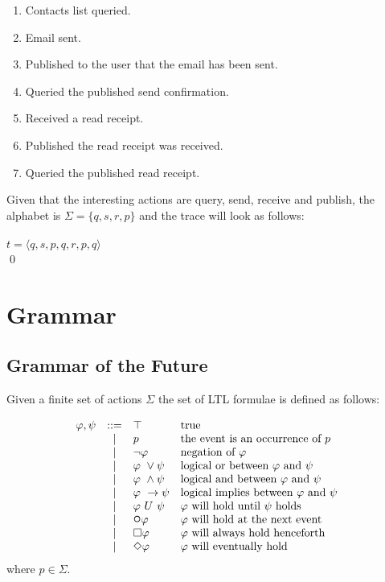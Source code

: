 \begin{definition}
\begin{myEx}
\begin{enumerate}
\item  Contacts list queried.
\item  Email sent.
\item  Published to the user that the email has been sent.
\item  Queried the published send confirmation.
\item  Received a read receipt.
\item  Published the read receipt was received.
\item  Queried the published read receipt.
\end{enumerate}

Given that the interesting actions are query, send, receive and publish, the alphabet is $\Sigma = \{ q, s, r, p \}$ and the trace will look as follows:\\
\\
$ t = \langle q, s, p, q, r, p, q \rangle $\\
\qed
\end{myEx}
\end{definition}

\section{Grammar}

\subsection{Grammar of the Future}
\label{sec:LTLFutureGrammar}

\begin{definition}Given a finite set of actions $ \Sigma $ the set of LTL formulae is defined as follows:

$$ \begin{array}{lcll}
\varphi, \psi & ::= & \top & \mbox{true}\
\\
& | & p & \mbox{the event is an occurrence of}\ p\ 
\\ 
&| & \neg\varphi & \mbox{negation of}\ \varphi\ 
\\
&| & \varphi\ \lor \psi & \mbox{logical or between}\ \varphi\ \mbox{and}\ \psi\
\\
&| & \varphi\ \land \psi & \mbox{logical and between}\ \varphi\ \mbox{and}\ \psi\
\\
& | & \varphi\ \rightarrow \psi & \mbox{logical implies between}\ \varphi\ \mbox{and}\ \psi\
\\
& | & \varphi\ U\ \psi & \varphi\ \mbox{will hold until}\ \psi\ \mbox{holds}\
\\
& | & \LTLnext\varphi & \varphi\ \mbox{will hold at the next event}\ 
\\
& | & \LTLalways\varphi & \varphi\ \mbox{will always hold henceforth}\
\\
& | & \LTLeventually\varphi & \varphi\ \mbox{will eventually hold}\ 
\end{array}$$
where $ p \in \Sigma $.
\end{definition}

